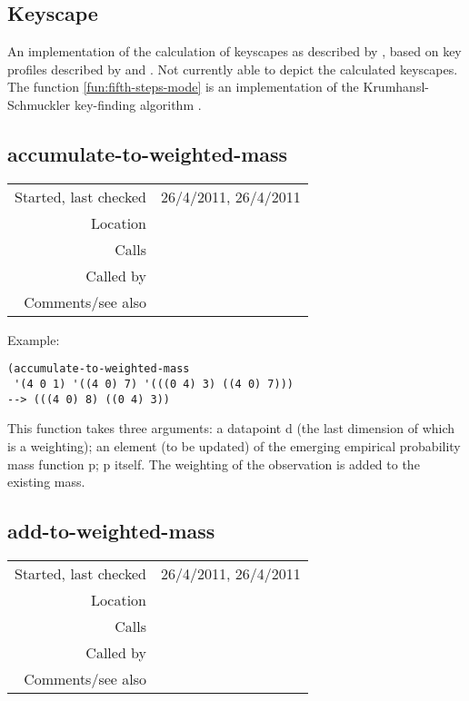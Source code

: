 \subsection{Keyscape}\label{sec:keyscape}

An implementation of the calculation of
keyscapes as described by \citet*{sapp2005}, based on
key profiles described by \citet*{krumhansl1982} and
\citet*{aarden2003}. Not currently able to depict the
calculated keyscapes. The function
\ref{fun:fifth-steps-mode} is an implementation of the
Krumhansl-Schmuckler key-finding algorithm
\citep*{krumhansl1990}.


\subsection*{accumulate-to-weighted-mass}\label{fun:accumulate-to-weighted-mass}

\vspace{0.3cm}
\begin{tabular}{r|p{8cm}}
Started, last checked & 26/4/2011, 26/4/2011 \\
Location & \nameref{sec:keyscape} \\
Calls & \nameref{fun:my-last} \\
Called by & \nameref{fun:present-to-weighted-mass} \\
Comments/see also & 
\end{tabular}

\vspace{0.5cm}
\noindent Example:
\begin{verbatim}
(accumulate-to-weighted-mass
 '(4 0 1) '((4 0) 7) '(((0 4) 3) ((4 0) 7)))
--> (((4 0) 8) ((0 4) 3))
\end{verbatim}

\noindent This function takes three arguments: a
datapoint d (the last dimension of which is a
weighting); an element (to be updated) of the
emerging empirical probability mass function p;
p itself. The weighting of the observation is added to
the existing mass.


\subsection*{add-to-weighted-mass}\label{fun:add-to-weighted-mass}

\vspace{0.3cm}
\begin{tabular}{r|p{8cm}}
Started, last checked & 26/4/2011, 26/4/2011 \\
Location & \nameref{sec:keyscape} \\
Calls & \nameref{fun:my-last} \\
Called by & \nameref{fun:present-to-weighted-mass} \\
Comments/see also & 
\end{tabular}

